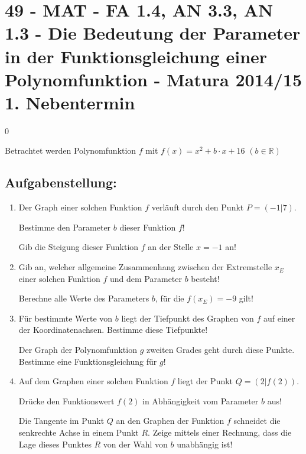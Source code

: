 \section{49 - MAT - FA 1.4, AN 3.3, AN 1.3 - Die Bedeutung der Parameter in der Funktionsgleichung einer Polynomfunktion - Matura 2014/15 1. Nebentermin}

\begin{langesbeispiel} \item[0] %
				
				Betrachtet werden Polynomfunktion $f$ mit $f(x)=x^2+b\cdot x+16$ $(b\in\mathbb{R})$

\subsection{Aufgabenstellung:}
\begin{enumerate}
	\item Der Graph einer solchen Funktion $f$ verläuft durch den Punkt $P=(-1|7)$.
	
	 Bestimme den Parameter $b$ dieser Funktion $f$!
	
	Gib die Steigung dieser Funktion $f$ an der Stelle $x=-1$ an!
	
\item Gib an, welcher allgemeine Zusammenhang zwischen der Extremstelle $x_E$ einer solchen Funktion $f$ und dem Parameter $b$ besteht!

Berechne alle Werte des Parameters $b$, für die $f(x_E)=-9$ gilt!

\item Für bestimmte Werte von $b$ liegt der Tiefpunkt des Graphen von $f$ auf einer der Koordinatenachsen. Bestimme diese Tiefpunkte!

Der Graph der Polynomfunktion $g$ zweiten Grades geht durch diese Punkte. Bestimme eine Funktionsgleichung für $g$!

\item Auf dem Graphen einer solchen Funktion $f$ liegt der Punkt $Q=(2|f(2))$.

Drücke den Funktionswert $f(2)$ in Abhängigkeit vom Parameter $b$ aus!

Die Tangente im Punkt $Q$ an den Graphen der Funktion $f$ schneidet die senkrechte Achse in einem Punkt $R$. Zeige mittels einer Rechnung, dass die Lage dieses Punktes $R$ von der Wahl von $b$ unabhängig ist!
						\end{enumerate}\leer
				
\end{langesbeispiel}
